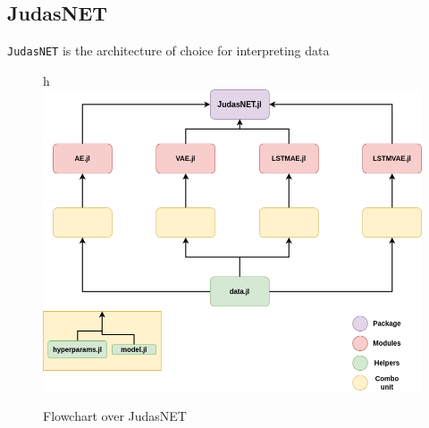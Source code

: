 \subsection{JudasNET}

\texttt{JudasNET} is the architecture of choice for interpreting data

\begin{figure}{h}
    \centering
    \includegraphics{figures/judasnet.png}
    \caption{Flowchart over JudasNET}
    \label{fig:judasnet}
\end{figure}